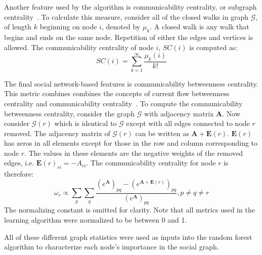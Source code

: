 \documentclass[12pt]{report}
\begin{document}
Another feature used by the algorithm is communicability centrality, or subgraph centrality~\cite{Estrada_2005}.  
To calculate this measure, consider all of the closed walks in graph $\mathcal{G}$, of length $k$ beginning on node $i$, denoted by $\mu_k$.
A closed walk is any walk that begins and ends on the same node.
Repetition of either the edges and vertices is allowed.
The communicability centrality of node $i$, $SC(i)$ is computed as:
\begin{equation}
SC(i) = \sum_{k=1}^\infty \frac{\mu_k(i)}{k!}
\end{equation}

The final social network-based features is 
communicability betweenness centrality.
This metric combines combines the concepts of current flow betweenness centrality and communicability centrality~\cite{estrada2008communicability}.
To compute the communicability betweenness centrality, consider the graph $\mathcal{G}$  with adjacency matrix $\boldsymbol{A}$.
Now consider $\mathcal{G}(r)$ which is identical to $\mathcal{G}$ except with all edges connected to node $r$ removed.
The adjacency matrix of $\mathcal{G}(r)$ can be written as $\boldsymbol{A}+\boldsymbol{E}(r)$.
$\boldsymbol{E}(r)$ has zeros in all elements except for those in the row and column corresponding to node $r$.
The values in these elements are the negative weights of the removed edges, i.e. $\boldsymbol{E}(r)_{ri} = -A_{ri}$.
The communicability centrality for node $r$ is therefore:
\begin{equation}
\omega_r \propto \sum_{p}\sum_{q} \frac{\left(e^{\boldsymbol{A}} \right)_{pq} - \left(e^{\boldsymbol{A}+\boldsymbol{E}(r)} \right)_{pq}}{\left(e^{\boldsymbol{A}}\right)_{pq}}, p\neq q \neq r
\end{equation}
The normalizing constant is omitted for clarity.
Note that all metrics used in the learning algorithm were normalized to be between 0 and 1.

All of these different graph statistics were used as inputs into the random forest algorithm to characterize each node's importance in the social graph.
\end{document}
